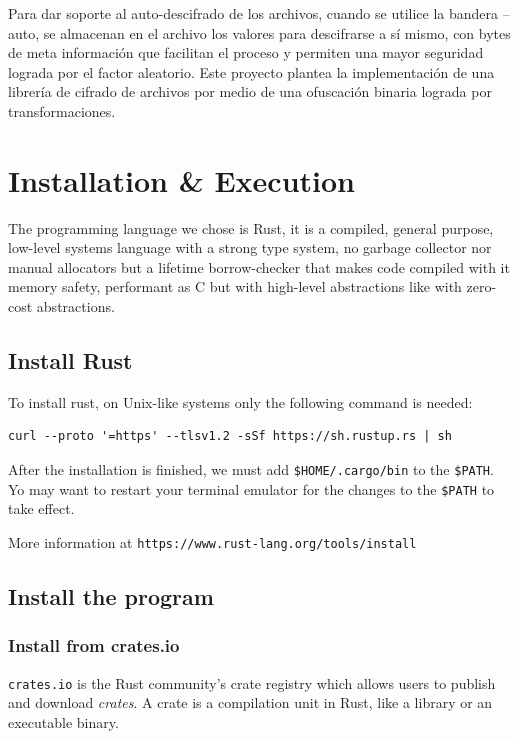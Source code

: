 Para dar soporte al auto-descifrado de los archivos, cuando se utilice la
bandera --auto, se almacenan en el archivo los valores para descifrarse a sí
mismo, 
con bytes de meta información que facilitan el proceso y permiten una mayor
seguridad lograda por el factor aleatorio. Este proyecto plantea la
implementación 
de una librería de cifrado de archivos por medio de una ofuscación binaria
lograda por transformaciones.

\newpage
\section{Installation \& Execution}

The programming language we chose is Rust, it is a compiled,
general purpose, low-level systems language with a strong type system,
no garbage collector nor manual allocators but a lifetime borrow-checker that
makes code compiled with it memory safety, performant as C but with high-level
abstractions like with zero-cost abstractions.

\subsection{Install Rust}

To install rust, on Unix-like systems only the following command is needed:

\begin{verbatim}
curl --proto '=https' --tlsv1.2 -sSf https://sh.rustup.rs | sh
\end{verbatim}

After the installation is finished, we must add \texttt{\$HOME/.cargo/bin} to the \texttt{\$PATH}.
Yo may want to restart your terminal emulator for the changes to the \texttt{\$PATH} to take effect.

More information at \texttt{https://www.rust-lang.org/tools/install}

\subsection{Install the program}

\subsubsection{Install from crates.io}

\texttt{crates.io} is the Rust community’s crate registry which allows users to publish and download \textit{crates}.
A crate is a compilation unit in Rust, like a library or an executable binary.

